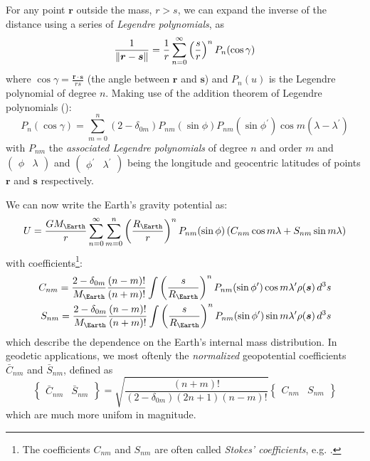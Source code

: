 For any point $\bm{r}$ outside the mass, $r > s$, we can expand the inverse of the 
distance using a series of \emph{Legendre polynomials}, as
\begin{equation}
  \frac{1}{\lVert\bm{r}-\bm{s}\rVert} = \frac{1}{r} \sum_{n=0}^{\infty} 
    \left( \frac{s}{r} \right) ^n  P_n ( \cos \gamma )
\end{equation}
where $\cos \gamma = \frac{\bm{r} \cdot \bm{s}}{rs}$ (the angle between $\bm{r}$
and $\bm{s}$) and $P_n(u)$ is the Legendre polynomial of degree $n$. Making use of 
the addition theorem of Legendre polynomials (\cite{Montenbruck2000}):
\begin{equation}
  \label{eq:mont38}
  P_n (\cos \gamma ) = \sum_{m=0}^{n} \left( 2 - \delta _{0m} \right) 
    P_{nm} (\sin \phi ) P_{nm} (\sin{\phi ^\prime}) 
    \cos{m \left( \lambda - \lambda ^\prime \right) }
\end{equation}
with $P_{nm}$ the \emph{associated Legendre polynomials} of degree $n$ and order 
$m$ and $\begin{pmatrix} \phi & \lambda \end{pmatrix}$ and 
$\begin{pmatrix} \phi ^\prime & \lambda ^\prime \end{pmatrix}$ being the longitude 
and geocentric latitudes of points $\bm{r}$ and $\bm{s}$ respectively.

We can now write the Earth's gravity potential as:
\begin{equation}
  U = \frac{G M_{\Earth}}{r} \sum_{n=0}^{\infty} \sum_{m=0}^{n} 
      \left( \frac{R_{\Earth}}{r} \right) ^n P_{nm} (\sin \phi )
      \left( C_{nm} \cos {m\lambda} + S_{nm} \sin{m\lambda} \right)
\end{equation}
with coefficients\footnote{The coefficients $C_{nm}$ and $S_{nm}$ are often called 
\emph{Stokes' coefficients}, e.g. \cite{Barthelmes2018}.}:
\begin{equation}
  \begin{aligned}
    C_{nm} = \frac{2 - \delta _{0m}}{M_{\Earth}} \frac{(n-m)!}{(n+m)!} 
      \int \left({\frac{s}{R_{\Earth}}}\right)^n P_{nm} (\sin \phi ^\prime) \cos {m\lambda ^\prime} \rho (\bm{s}) \, d^3 s \\
    S_{nm} = \frac{2 - \delta _{0m}}{M_{\Earth}} \frac{(n-m)!}{(n+m)!} 
      \int \left({\frac{s}{R_{\Earth}}}\right)^n P_{nm} (\sin \phi ^\prime) \sin {m\lambda ^\prime} \rho (\bm{s}) \, d^3 s
  \end{aligned}
\end{equation}
which describe the dependence on the Earth's internal mass distribution. In geodetic 
applications, we most oftenly the \emph{normalized} geopotential coefficients 
$\bar{C}_{nm}$ and ${\bar{S}}_{nm}$, defined as
\begin{equation}
  \begin{Bmatrix} \bar{C}_{nm} & \bar{S}_{nm} \end{Bmatrix} = 
  \sqrt{\frac{(n+m)!}{\left(2-\delta _{0m}\right) \left(2n+1\right) \left(n-m\right)!}}
  \begin{Bmatrix} C_{nm} & S_{nm} \end{Bmatrix}
\end{equation}
which are much more unifom in magnitude.

